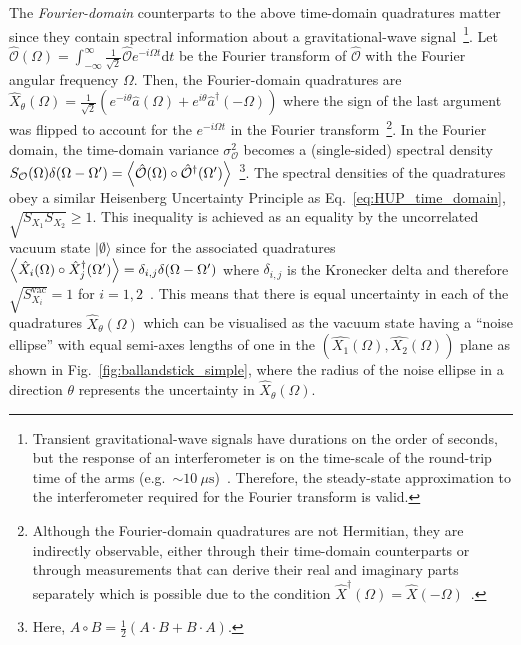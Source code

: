 The \emph{Fourier-domain} counterparts to the above time-domain quadratures matter since they contain spectral information about a gravitational-wave signal~\footnote{Transient gravitational-wave signals have durations on the order of seconds, but the response of an interferometer is on the time-scale of the round-trip time of the arms (e.g.\ $\sim10~\mu\text{s}$)~\cite{bond_2010}. Therefore, the steady-state approximation to the interferometer required for the Fourier transform is valid.}. %
Let $\hat{\mathcal{O}}(\Omega) = \int_{-\infty}^\infty \frac{1}{\sqrt{2}} \hat{\mathcal{O}} e^{-i\Omega t}\mathrm{d}t$ be the Fourier transform of $\hat{\mathcal{O}}$ with the Fourier angular frequency $\Omega$. Then, the Fourier-domain quadratures are $\hat{X}_\theta(\Omega)=\frac{1}{\sqrt{2}}(e^{-i \theta}\hat{a}(\Omega)+e^{i \theta}\hat{a}^\dag(-\Omega))$ where the sign of the last argument was flipped to account for the $e^{-i\Omega t}$ in the Fourier transform~\footnote{Although the Fourier-domain quadratures are not Hermitian, they are indirectly observable, either through their time-domain counterparts or through measurements that can derive their real and imaginary parts separately which is possible due to the condition $\hat{X}^\dag(\Omega)=\hat{X}(-\Omega)$~\cite{SCHUMAKER1986317}.}.
In the Fourier domain, the time-domain variance $\sigma_\mathcal{O}^2$ becomes a (single-sided) spectral density $S_\mathcal{O}(\Omega)\delta(\Omega-\Omega')=\ev{\hat{\mathcal{O}}(\Omega)\circ\hat{\mathcal{O}}^\dag(\Omega')}$~\footnote{Here, $A\circ B=\frac{1}{2}(A\cdot B+B\cdot A)$.}.
The spectral densities of the quadratures obey a similar Heisenberg Uncertainty Principle as Eq.~\ref{eq:HUP_time_domain}, $\sqrt{S_{X_1}S_{X_2}}\geq1$. 
This inequality is achieved as an equality by the uncorrelated vacuum state $\lvert\emptyset\rangle$ since for the associated quadratures $\ev{\hat{X}_i(\Omega)\circ\hat{X}_j^\dag(\Omega')}=\delta_{i,j}\delta(\Omega-\Omega')$ where $\delta_{i,j}$ is the Kronecker delta and therefore $\sqrt{S_{X_i}^\text{vac}}=1$ for $i=1,2$~\cite{danilishinQuantumMeasurementTheory2012}. This means that there is equal uncertainty in each of the quadratures $\hat{X}_\theta(\Omega)$ which can be visualised as the vacuum state having a ``noise ellipse'' with equal semi-axes lengths of one in the $(\hat{X_1}(\Omega),\hat{X_2}(\Omega))$ plane as shown in Fig.~\ref{fig:ballandstick_simple}, where the radius of the noise ellipse in a direction $\theta$ represents the uncertainty in $\hat{X}_\theta(\Omega)$.


